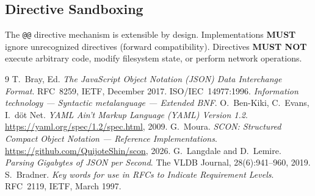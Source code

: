 \documentclass[11pt, a4paper]{article}
\begin{document}
\subsection{Directive Sandboxing}

The \texttt{@@} directive mechanism is extensible by design.
Implementations \textbf{MUST} ignore unrecognized directives
(forward compatibility). Directives \textbf{MUST NOT} execute
arbitrary code, modify filesystem state, or perform network
operations.


\begin{thebibliography}{9}
 T.~Bray, Ed.
  \textit{The JavaScript Object Notation (JSON) Data Interchange Format}.
  RFC~8259, IETF, December 2017.
 ISO/IEC~14977:1996.
  \textit{Information technology --- Syntactic metalanguage --- Extended BNF}.
 O.~Ben-Kiki, C.~Evans, I.~d\"ot Net.
  \textit{YAML Ain't Markup Language (YAML) Version 1.2}.
  \url{https://yaml.org/spec/1.2/spec.html}, 2009.
 G.~Moura.
  \textit{SCON: Structured Compact Object Notation --- Reference Implementations}.
  \url{https://github.com/QuijoteShin/scon}, 2026.
 G.~Langdale and D.~Lemire.
  \textit{Parsing Gigabytes of JSON per Second}.
  The VLDB Journal, 28(6):941--960, 2019.
 S.~Bradner.
  \textit{Key words for use in RFCs to Indicate Requirement Levels}.
  RFC~2119, IETF, March 1997.
\end{thebibliography}
\end{document}
